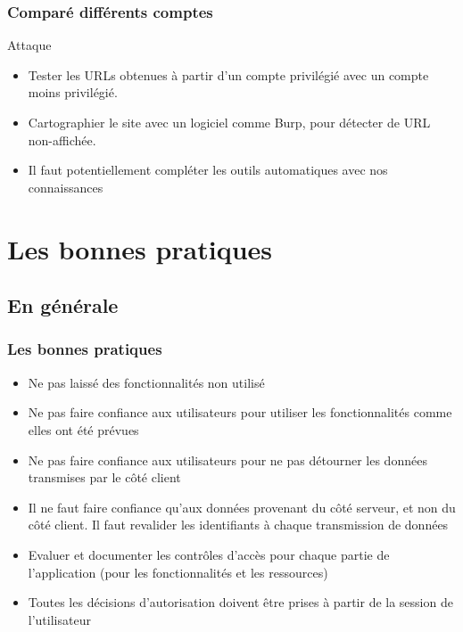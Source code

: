 \documentclass{beamer}
\begin{document}
\begin{frame}
  \frametitle{Comparé différents comptes}
  \begin{alertblock}{Attaque}
    \begin{itemize}
      \item Tester les URLs obtenues à partir d'un compte privilégié avec un compte moins privilégié.
      \item Cartographier le site avec un logiciel comme Burp, pour détecter de URL non-affichée.
      \item Il faut potentiellement compléter les outils automatiques avec nos connaissances
    \end{itemize}
  \end{alertblock}
\end{frame}


\section{Les bonnes pratiques}
\subsection{En générale}
\begin{frame}
  \frametitle{Les bonnes pratiques}
  \begin{exampleblock}{}
    \begin{itemize}
      \item Ne pas laissé des fonctionnalités non utilisé
    \end{itemize}
  \end{exampleblock}
  \begin{exampleblock}{}
    \begin{itemize}
      \item Ne pas faire confiance aux utilisateurs pour utiliser les fonctionnalités comme elles ont été prévues
      \item Ne pas faire confiance aux utilisateurs pour ne pas détourner les données transmises par le côté client
      \item Il ne faut faire confiance qu'aux données provenant du côté serveur, et non du côté client. Il faut revalider les identifiants à chaque transmission de données
    \end{itemize}
  \end{exampleblock}
  \begin{exampleblock}{}
    \begin{itemize}
      \item Evaluer et documenter les contrôles d'accès pour chaque partie de l'application (pour les fonctionnalités et les ressources)
    \end{itemize}
  \end{exampleblock}
  \begin{exampleblock}{}
    \begin{itemize}
      \item Toutes les décisions d'autorisation doivent être prises à partir de la session de l'utilisateur
    \end{itemize}
  \end{exampleblock}
\end{frame}
\end{document}
